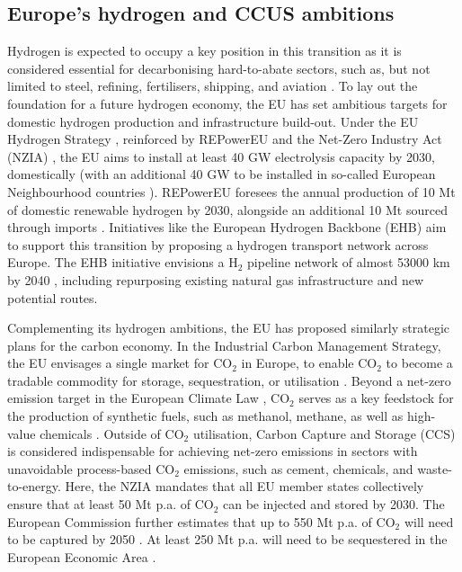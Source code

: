 \documentclass[pdflatex,sn-nature]{sn-jnl}
\theoremstyle{thmstyleone}%
\theoremstyle{thmstyletwo}%
\theoremstyle{thmstylethree}%
\begin{document}
\subsection{Europe's hydrogen and CCUS ambitions}
Hydrogen is expected to occupy a key position in this transition as it is considered essential for decarbonising hard-to-abate sectors, such as, but not limited to steel, refining, fertilisers, shipping, and aviation \cite{beresWillHydrogenSynthetic2024,neumannPotentialRoleHydrogen2023}. To lay out the foundation for a future hydrogen economy, the EU has set ambitious targets for domestic hydrogen production and infrastructure build-out. Under the EU Hydrogen Strategy \cite{europeancommissionCommunicationCommissionEuropean2020}, reinforced by REPowerEU \cite{europeancommissionREPowerEUPlanCommunication2022} and the Net-Zero Industry Act (NZIA) \cite{europeanparliamentRegulationEU20242024}, the EU aims to install at least 40 GW electrolysis capacity by 2030, domestically (with an additional 40 GW to be installed in so-called European Neighbourhood countries \cite{europeanparliamentRegulationEU20212021a}). REPowerEU foresees the annual production of 10 Mt of domestic renewable hydrogen by 2030, alongside an additional 10 Mt sourced through imports \cite{europeancommissionREPowerEUPlanCommunication2022}. Initiatives like the European Hydrogen Backbone (EHB) aim to support this transition by proposing a hydrogen transport network across Europe. The EHB initiative envisions a H$_2$ pipeline network of almost 53000 km by 2040 \cite{europeanhydrogenbackboneinitiativeEuropeanHydrogenBackbone2022}, including repurposing existing natural gas infrastructure and new potential routes.

Complementing its hydrogen ambitions, the EU has proposed similarly strategic plans for the carbon economy. In the Industrial Carbon Management Strategy, the EU envisages a single market for CO$_2$ in Europe, to enable CO$_2$ to become a tradable commodity for storage, sequestration, or utilisation \cite{europeancourtofauditorsEUsIndustrialPolicy2024}. Beyond a net-zero emission target in the European Climate Law \cite{europeanparliamentRegulationEU20212021}, CO$_2$ serves as a key feedstock for the production of synthetic fuels, such as methanol, methane, as well as high-value chemicals \cite{neumannPotentialRoleHydrogen2023}. Outside of CO$_2$ utilisation, Carbon Capture and Storage (CCS) is considered indispensable for achieving net-zero emissions in sectors with unavoidable process-based CO$_2$ emissions, such as cement, chemicals, and waste-to-energy. Here, the NZIA mandates that all EU member states collectively ensure that at least 50 Mt p.a. of CO$_2$ can be injected and stored by 2030. The European Commission further estimates that up to 550 Mt p.a. of CO$_2$ will need to be captured by 2050 \cite{europeanparliamentRegulationEU20242024}. At least 250 Mt p.a. will need to be sequestered in the European Economic Area \cite{europeancommissionCommunicationCommissionEuropean2024}.
\end{document}
